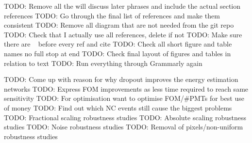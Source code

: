 TODO: Remove all the will discuss later phrases and include the actual section references
TODO: Go through the final list of references and make them consistent
TODO: Remove all diagram that are not needed from the git repo
TODO: Check that I actually use all references, delete if not
TODO: Make sure there are ~ before every ref and cite
TODO: Check all short figure and table names no full stop at end
TODO: Check final layout of figures and tables in relation to text
TODO: Run everything through Grammarly again

TODO: Come up with reason for why dropout improves the energy estimation networks
TODO: Express FOM improvements as less time required to reach same sensitivity
TODO: For optimisation want to optimise FOM/#PMTs for best use of money
TODO: Find out which NC events still cause the biggest problems
TODO: Fractional scaling robustness studies
TODO: Absolute scaling robustness studies
TODO: Noise robustness studies
TODO: Removal of pixels/non-uniform robustness studies